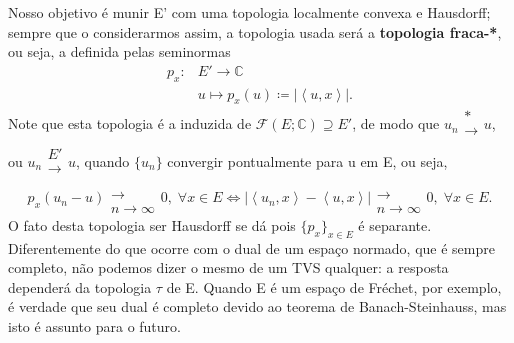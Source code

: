 \documentclass[../distribution_theory_notes.tex]{subfiles}
\begin{document}
Nosso objetivo é munir E' com uma topologia localmente convexa e Hausdorff; sempre que o considerarmos assim, a topologia usada será a \textbf{topologia fraca-*}, ou seja, a definida pelas seminormas 
\begin{align*}
  p_{x}:&E'\rightarrow \mathbb{C}\\ 
        &u\mapsto p_{x}(u) \coloneqq |\left< u, x \right>|.
\end{align*}
Note que esta topologia é a induzida de \(\mathcal{F}(E; \mathbb{C})\supseteq E'\), de modo que \(u_{n}\substack{* \\ \longrightarrow \\ }u\), ou \(u_{n}\substack{E' \\ \longrightarrow \\ }u\), quando \(\{u_{n}\}\) convergir pontualmente para u em E, ou seja,
  \[
    p_{x}(u_{n}-u)\substack{ \\ \longrightarrow \\ n\to \infty}0,\; \forall x\in E \Longleftrightarrow |\left< u_{n}, x \right>-\left< u, x \right>|\substack{ \\ \longrightarrow \\ n\to \infty}0,\; \forall x\in E.
  \]
  O fato desta topologia ser Hausdorff se dá pois \(\{p_{x}\}_{x\in E}\) é separante. Diferentemente do que ocorre com o dual de um espaço normado, que é sempre completo, não podemos dizer o mesmo de um TVS qualquer: a resposta dependerá da topologia \(\tau \) de E. Quando E é um espaço de Fréchet, por exemplo, é verdade que seu dual é completo devido ao teorema de Banach-Steinhauss, mas isto é assunto para o futuro.
\end{document}
